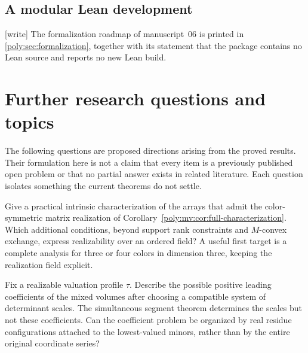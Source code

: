 \documentclass[11pt,a4paper]{article}
\numberwithin{equation}{section}
\theoremstyle{plain}
\newcommand{\wtag}{\textup{[write]}}%
\begin{document}
\subsection{A modular Lean development}\label{poly:mv:sec:lean-pointer}
\wtag{} The formalization roadmap of manuscript~06 is printed in
\cref{poly:sec:formalization}, together with its statement that the package contains no Lean source and reports no
new Lean build.

\section{Further research questions and topics}
\label{poly:mv:sec:research}

The following questions are proposed directions arising from the proved
results. Their formulation here is not a claim that every item is a
previously published open problem or that no partial answer exists in
related literature. Each question isolates something the current theorems
do not settle.

\begin{question}
Give a practical intrinsic characterization of the arrays that admit the
color-symmetric matrix realization of
Corollary~\ref{poly:mv:cor:full-characterization}. Which additional conditions,
beyond support rank constraints and $M$-convex exchange, express
realizability over an ordered field? A useful first target is a complete
analysis for three or four colors in dimension three, keeping the
realization field explicit.
\end{question}

\begin{question}
Fix a realizable valuation profile $\tau$. Describe the possible positive
leading coefficients of the mixed volumes after choosing a compatible
system of determinant scales. The simultaneous segment theorem determines
the scales but not these coefficients. Can the coefficient problem be
organized by real residue configurations attached to the lowest-valued
minors, rather than by the entire original coordinate series?
\end{question}
\end{document}
